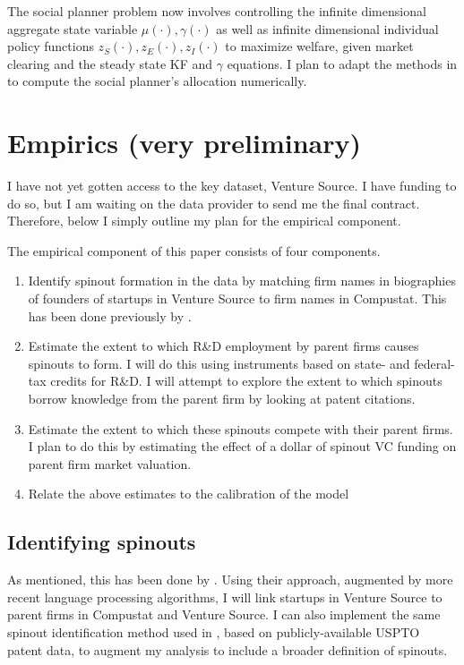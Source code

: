 \documentclass[11pt,english]{article}
\theoremstyle{remark}
\begin{document}
The social planner problem now involves controlling the infinite dimensional aggregate state variable $\mu(\cdot), \gamma(\cdot)$ as well as infinite dimensional individual policy functions $z_S(\cdot),z_E(\cdot),z_I(\cdot)$ to maximize welfare, given market clearing and the steady state KF and $\gamma$ equations. I plan to adapt the methods in \cite{nuno_social_2018} to compute the social planner's allocation numerically.

\section{Empirics (very preliminary)}\label{empirics}

I have not yet gotten access to the key dataset, Venture Source. I have funding to do so, but I am waiting on the data provider to send me the final contract. Therefore, below I simply outline my plan for the empirical component. 

The empirical component of this paper consists of four components. 

\begin{enumerate}
	\item Identify spinout formation in the data by matching firm names in biographies of founders of startups in Venture Source to firm names in Compustat. This has been done previously by \cite{gompers_entrepreneurial_2005}.
	\item Estimate the extent to which R\&D employment by parent firms causes spinouts to form. I will do this using instruments based on state- and federal-tax credits for R\&D. I will attempt to explore the extent to which spinouts borrow knowledge from the parent firm by looking at patent citations.
	\item Estimate the extent to which these spinouts compete with their parent firms. I plan to do this by estimating the effect of a dollar of spinout VC funding on parent firm market valuation.
	\item Relate the above estimates to the calibration of the model
\end{enumerate}

\subsection{Identifying spinouts}

As mentioned, this has been done by \cite{gompers_entrepreneurial_2005}. Using their approach, augmented by more recent language processing algorithms, I will link startups in Venture Source to parent firms in Compustat and Venture Source. I can also implement the same spinout identification method used in \cite{baslandze_spinout_2019}, based on publicly-available USPTO patent data, to augment my analysis to include a broader definition of spinouts.
\end{document}
